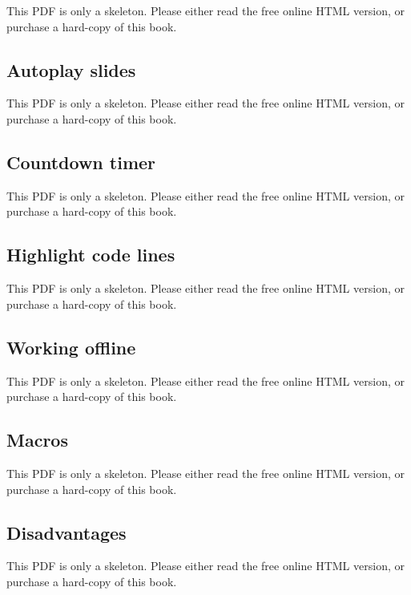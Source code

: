 \documentclass[
  11pt,
]{krantz}
\theoremstyle{definition}
\theoremstyle{definition}
\theoremstyle{definition}
\theoremstyle{definition}
\theoremstyle{remark}
\begin{document}
This PDF is only a skeleton. Please either read the free online HTML version, or purchase a hard-copy of this book.

\subsection{Autoplay slides}\label{autoplay-slides}

This PDF is only a skeleton. Please either read the free online HTML version, or purchase a hard-copy of this book.

\subsection{Countdown timer}\label{countdown-timer}

This PDF is only a skeleton. Please either read the free online HTML version, or purchase a hard-copy of this book.

\subsection{Highlight code lines}\label{highlight-code-lines}

This PDF is only a skeleton. Please either read the free online HTML version, or purchase a hard-copy of this book.

\subsection{Working offline}\label{working-offline}

This PDF is only a skeleton. Please either read the free online HTML version, or purchase a hard-copy of this book.

\subsection{Macros}\label{macros}

This PDF is only a skeleton. Please either read the free online HTML version, or purchase a hard-copy of this book.

\subsection{Disadvantages}\label{disadvantages}

This PDF is only a skeleton. Please either read the free online HTML version, or purchase a hard-copy of this book.
\end{document}
